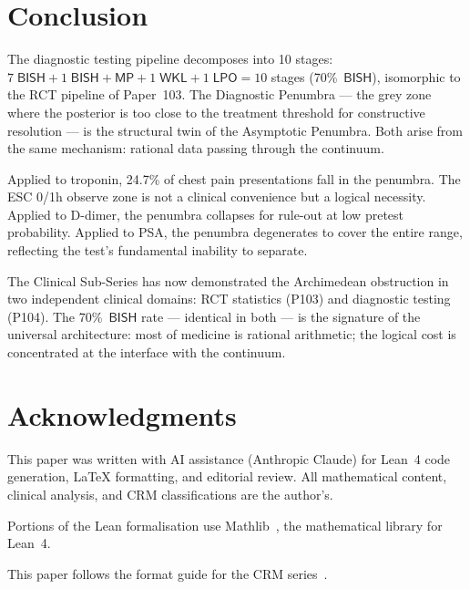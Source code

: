 \documentclass[11pt,a4paper]{article}
\theoremstyle{plain}
\theoremstyle{definition}
\newcommand{\BISH}{\textsf{BISH}}
\newcommand{\WKL}{\textsf{WKL}}
\newcommand{\LPO}{\textsf{LPO}}
\newcommand{\MP}{\textsf{MP}}
\begin{document}
\section{Conclusion}\label{sec:conclusion}

The diagnostic testing pipeline decomposes into 10 stages: $7\;\BISH + 1\;\BISH{+}\MP + 1\;\WKL + 1\;\LPO = 10$ stages (70\%~$\BISH$), isomorphic to the RCT pipeline of Paper~103.  The Diagnostic Penumbra --- the grey zone where the posterior is too close to the treatment threshold for constructive resolution --- is the structural twin of the Asymptotic Penumbra.  Both arise from the same mechanism: rational data passing through the continuum.

Applied to troponin, 24.7\% of chest pain presentations fall in the penumbra.  The ESC 0/1h observe zone is not a clinical convenience but a logical necessity.  Applied to D-dimer, the penumbra collapses for rule-out at low pretest probability.  Applied to PSA, the penumbra degenerates to cover the entire range, reflecting the test's fundamental inability to separate.

The Clinical Sub-Series has now demonstrated the Archimedean obstruction in two independent clinical domains: RCT statistics (P103) and diagnostic testing (P104).  The 70\%~$\BISH$ rate --- identical in both --- is the signature of the universal architecture: most of medicine is rational arithmetic; the logical cost is concentrated at the interface with the continuum.

\section*{Acknowledgments}

This paper was written with AI assistance (Anthropic Claude) for Lean~4 code generation, LaTeX formatting, and editorial review.  All mathematical content, clinical analysis, and CRM classifications are the author's.

Portions of the Lean formalisation use Mathlib~\cite{mathlib}, the mathematical library for Lean~4.

This paper follows the format guide for the CRM series~\cite{lee-format-guide}.
\end{document}
